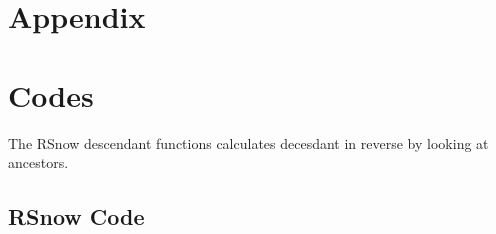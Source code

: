 \documentclass[11pt,letterpaper]{article}
\begin{document}
\newpage

\section{Appendix}

\appendix
\section{Codes} \label{App:AppendixA}

The RSnow descendant functions calculates decesdant in reverse by looking at ancestors.

\subsection{RSnow Code}
\end{document}
